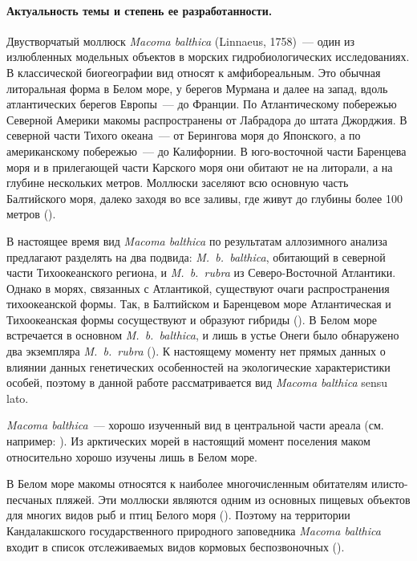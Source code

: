 \paragraph {Актуальность темы и степень ее разработанности.}
Двустворчатый моллюск {\it Macoma balthica} (Linnaeus, 1758)~--- один из излюбленных модельных объектов в морских гидробиологических исследованиях. 
В классической биогеографии вид относят к амфибореальным. 
Это обычная литоральная форма в Белом море, у берегов Мурмана и далее на запад, вдоль атлантических берегов Европы~--- до Франции. 
По Атлантическому побережью Северной Америки макомы распространены от Лабрадора до штата Джорджия. 
В северной части Тихого океана~--- от Берингова моря до Японского, а по американскому побережью~--- до Калифорнии. 
В юго-восточной части Баренцева моря и в прилегающей части Карского моря они обитают  не на литорали, а на глубине нескольких метров. 
Моллюски заселяют всю основную часть Балтийского моря, далеко заходя во все заливы, где живут до глубины более 100 метров (\cite{Zacepin_Filatova_1968}).

В настоящее время вид {\it Macoma balthica} по результатам аллозимного анализа предлагают разделять на два подвида: {\it M.~b.~balthica}, обитающий в северной части Тихоокеанского региона, и {\it M.~b.~rubra} из Северо-Восточной Атлантики. 
Однако  в морях, связанных с  Атлантикой, существуют очаги распространения тихоокеанской формы. 
Так, в Балтийском и Баренцевом море Атлантическая и Тихоокеанская формы сосуществуют и образуют гибриды (\cite{Vainola_2003}). 
В Белом море встречается в основном {\it M.~b.~balthica}, и лишь в устье Онеги было обнаружено два экземпляра {\it M.~b.~rubra} (\cite{Nikula_et_al_2007}).
К настоящему моменту нет прямых данных о влиянии данных генетических особенностей на экологические характеристики особей, поэтому в данной работе рассматривается вид {\it Macoma balthica} sensu lato.


{\it Macoma balthica}~--- хорошо изученный вид в центральной части ареала (см. например: \cite{Segerstrale_1960, Lavoie_1970, Gilbert_1978, Vincent_et_al_1989, Hiddink_et_al_2002_predation_epifauna, Hiddink_et_al_2002_predation_infauna, Beukema_et_al_2009}). 
Из арктических морей в настоящий момент поселения маком относительно хорошо изучены лишь в Белом море.


В Белом море макомы относятся к наиболее многочисленным обитателям илисто-песчаных пляжей. 
Эти моллюски являются одним из основных пищевых объектов для многих видов рыб и птиц Белого моря (\cite{Azarov_1963, Percov_1963, Golcev_et_al_1997, Bianki_et_al_2003}). 
Поэтому на территории Кандалакшского государственного природного заповедника {\it Macoma balthica} входит в список отслеживаемых видов кормовых беспозвоночных (\cite{Nazarova_2003}).

